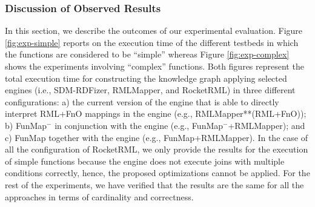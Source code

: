 \subsubsection{Discussion of Observed Results}
In this section, we describe the outcomes of our experimental evaluation. Figure \ref{fig:exp-simple} reports on the execution time of the different testbeds in which the functions are considered to be ``simple'' whereas Figure \ref{fig:exp-complex} shows the experiments involving ``complex'' functions. Both figures represent the total execution time for constructing the knowledge graph applying selected engines (i.e., SDM-RDFizer, RMLMapper, and RocketRML) in three different configurations: a) the current version of the engine that is able to directly interpret RML+FnO mappings in the engine (e.g., RMLMapper**(RML+FnO)); b) FunMap$^-$ in conjunction with the engine (e.g., FunMap$^-$+RMLMapper); and c) FunMap together with the engine (e.g., FunMap+RMLMapper). In the case of all the configuration of RocketRML, we only provide the results for the execution of simple functions because the engine does not execute joins with multiple conditions correctly, hence, the proposed optimizations cannot be applied. For the rest of the experiments, we have verified that the results are the same for all the approaches in terms of cardinality and correctness. 
